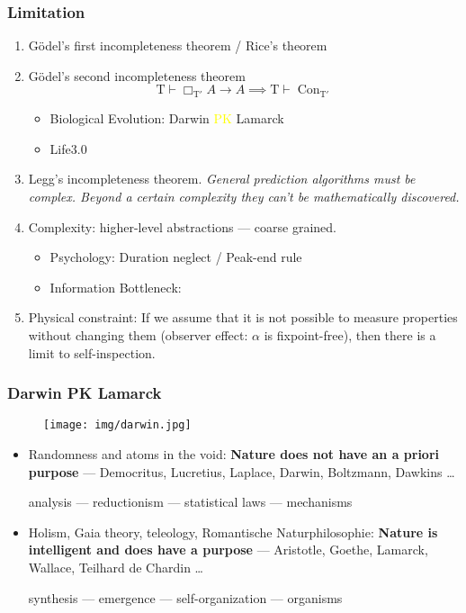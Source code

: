 \documentclass[UTF8,11pt,colorlinks,compress,openany]{beamer}%
\begin{document}
\begin{frame}\frametitle{Limitation}
\begin{enumerate}
	\item G\"odel's first incompleteness theorem / Rice's theorem
	\item G\"odel's second incompleteness theorem
	\[\mathrm{T}\vdash\Box_{\mathrm{T}'}A\to A\implies \mathrm{T}\vdash\operatorname{Con}_{\mathrm{T}'}\]
	\begin{itemize}
		\item Biological Evolution: Darwin \textcolor{yellow}{PK} Lamarck
		\item Life3.0
	\end{itemize}
	\item Legg's incompleteness theorem. \emph{General prediction algorithms must be complex. Beyond a certain complexity they can't be mathematically discovered.}
	\item Complexity: higher-level abstractions --- coarse grained.\\
	\begin{itemize}
		\item Psychology: Duration neglect / Peak-end rule
		\item Information Bottleneck: 
	\end{itemize}
	\item Physical constraint: If we assume that it is not possible to measure properties without changing them (observer effect: $\alpha$ is fixpoint-free), then there is a limit to self-inspection.
\end{enumerate}
\end{frame}

\begin{frame}\frametitle{Darwin PK Lamarck}
\begin{figure}[H]
\texttt{[image: img/darwin.jpg]}	
\end{figure}
\begin{itemize}
	\item Randomness and atoms in the void: \textbf{Nature does not have an a priori purpose} --- Democritus, Lucretius, Laplace, Darwin, Boltzmann, Dawkins \dots \\
	\centerline{analysis --- reductionism --- statistical laws --- mechanisms}
	\item Holism, Gaia theory, teleology, Romantische Naturphilosophie: \textbf{Nature is intelligent and does have a purpose} --- Aristotle, Goethe, Lamarck, Wallace, Teilhard de Chardin \dots \\
	\centerline{synthesis --- emergence --- self-organization --- organisms}
\end{itemize}
\end{frame}
\end{document}

